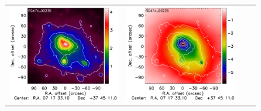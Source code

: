 \documentclass[traditabstract]{aa}
\begin{document}
\begin{figure}[h]
{\begin{tabular}{llll}
\includegraphics[trim=0cm 0.7cm 0.0cm 0cm, clip=true, scale=1]{Figure/Map_RG474_00235_DMmap_zproj_zobs0p4_raw.pdf} & 
\includegraphics[trim=2.3cm 0.7cm 0.0cm 0cm, clip=true, scale=1]{Figure/Map_RG474_00235_Ymap_zobs0p4_raw.pdf} & 

\end{tabular}}
\end{figure}
\end{document}
